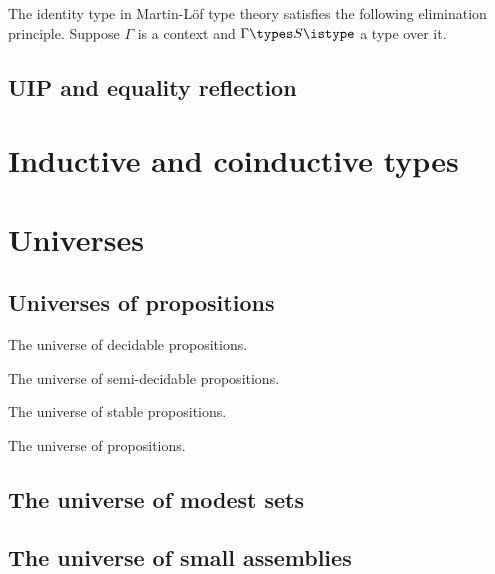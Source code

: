 The identity type in Martin-Löf type theory satisfies the following elimination principle. Suppose $\Gamma$ is a context and $\Gamma \types S \istype$ a type over it.




\subsection{UIP and equality reflection}
\label{sec:uip-equal-refl}

\section{Inductive and coinductive types}
\label{sec:inductive-counductive-types}

\section{Universes}
\label{sec:universes}

\subsection{Universes of propositions}
\label{sec:universe-propositions}

The universe of decidable propositions.

The universe of semi-decidable propositions.

The universe of stable propositions.

The universe of propositions.

\subsection{The universe of modest sets}
\label{sec:universe-modest-sets}

\subsection{The universe of small assemblies}
\label{sec:univ-small-assembl}



